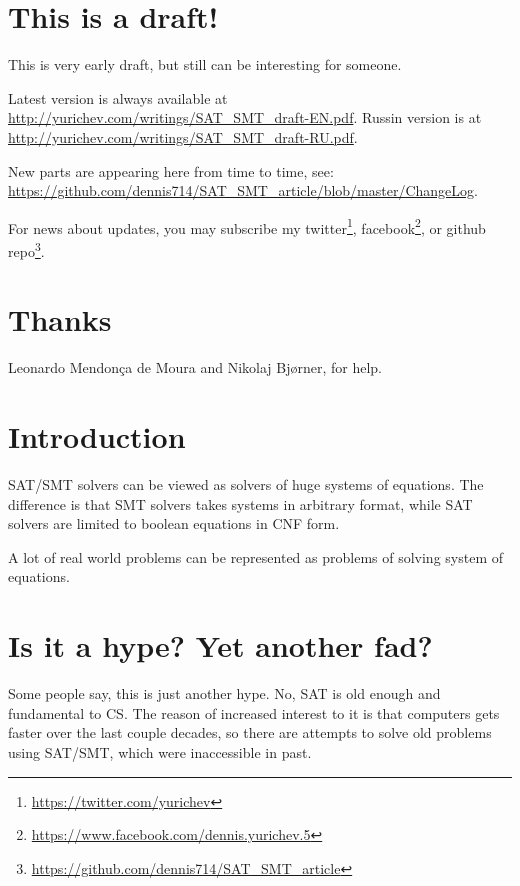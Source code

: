 \section{This is a draft!}

This is very early draft, but still can be interesting for someone.

Latest version is always available at \url{http://yurichev.com/writings/SAT_SMT_draft-EN.pdf}.
Russin version is at \url{http://yurichev.com/writings/SAT_SMT_draft-RU.pdf}.

New parts are appearing here from time to time, see: \url{https://github.com/dennis714/SAT_SMT_article/blob/master/ChangeLog}.

For news about updates, you may subscribe my 
twitter\footnote{\url{https://twitter.com/yurichev}}, 
facebook\footnote{\url{https://www.facebook.com/dennis.yurichev.5}}, 
or github repo\footnote{\url{https://github.com/dennis714/SAT_SMT_article}}.

\section{Thanks}

Leonardo Mendonça de Moura and Nikolaj Bjørner, for help.

\section{Introduction}

\ac{SAT}/\ac{SMT} solvers can be viewed as solvers of huge systems of equations.
The difference is that \ac{SMT} solvers takes systems in arbitrary format,
while \ac{SAT} solvers are limited to boolean equations in \ac{CNF} form.

A lot of real world problems can be represented as problems of solving system of equations.

\section{Is it a hype? Yet another fad?}

Some people say, this is just another hype.
No, \ac{SAT} is old enough and fundamental to \ac{CS}.
The reason of increased interest to it is that computers gets faster over the last couple decades,
so there are attempts to solve old problems using \ac{SAT}/\ac{SMT}, which were inaccessible in past.


